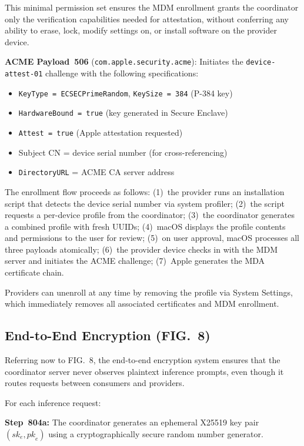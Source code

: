 \documentclass[11pt,letterpaper]{article}
\begin{document}
This minimal permission set ensures the MDM enrollment grants the coordinator only the verification capabilities needed for attestation, without conferring any ability to erase, lock, modify settings on, or install software on the provider device.

\textbf{ACME Payload~506} (\texttt{com.apple.security.acme}): Initiates the \texttt{device-attest-01} challenge with the following specifications:
\begin{itemize}[nosep]
\item \texttt{KeyType = ECSECPrimeRandom}, \texttt{KeySize = 384} (P-384 key)
\item \texttt{HardwareBound = true} (key generated in Secure Enclave)
\item \texttt{Attest = true} (Apple attestation requested)
\item Subject CN = device serial number (for cross-referencing)
\item \texttt{DirectoryURL} = ACME CA server address
\end{itemize}

The enrollment flow proceeds as follows: (1)~the provider runs an installation script that detects the device serial number via system profiler; (2)~the script requests a per-device profile from the coordinator; (3)~the coordinator generates a combined profile with fresh UUIDs; (4)~macOS displays the profile contents and permissions to the user for review; (5)~on user approval, macOS processes all three payloads atomically; (6)~the provider device checks in with the MDM server and initiates the ACME challenge; (7)~Apple generates the MDA certificate chain.

Providers can unenroll at any time by removing the profile via System Settings, which immediately removes all associated certificates and MDM enrollment.

\subsection{End-to-End Encryption (FIG.~8)}

Referring now to FIG.~8, the end-to-end encryption system ensures that the coordinator server never observes plaintext inference prompts, even though it routes requests between consumers and providers.

For each inference request:

\textbf{Step~804a:} The coordinator generates an ephemeral X25519 key pair $(\mathit{sk}_e, \mathit{pk}_e)$ using a cryptographically secure random number generator.
\end{document}
